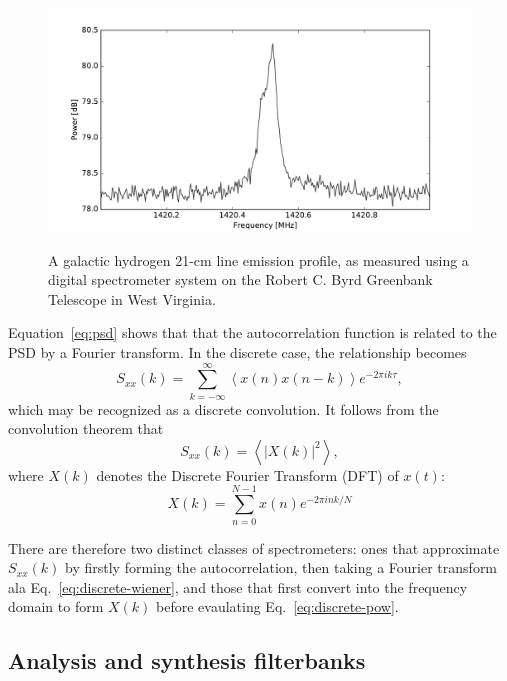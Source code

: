 \documentclass{ws-rv961x669}
\begin{document}
\begin{figure}
 \centering
 \includegraphics[width=\textwidth]{./figures/hydrogen.pdf}
 \label{fig:hydrogen}
 \caption{A galactic hydrogen 21-cm line emission profile, as measured using a digital spectrometer system on the Robert C. Byrd Greenbank Telescope in West Virginia.}
\end{figure}

Equation~\ref{eq:psd} shows that that the autocorrelation function is related to the PSD by a Fourier transform. In the discrete case, the relationship becomes
\begin{equation}
S_{xx}(k)=\sum_{k=-\infty}^{\infty}\left\langle x(n)x(n-k)\right\rangle e^{-2\pi ik\tau},\label{eq:discrete-wiener}
\end{equation}
which may be recognized as a discrete convolution. It follows from the convolution theorem that 
\begin{equation}
S_{xx}(k)=\left\langle \left|X(k)\right|^{2}\right\rangle ,\label{eq:discrete-pow}
\end{equation}
where $X(k)$ denotes the Discrete Fourier Transform (DFT) of $x(t)$:
\begin{equation}
X(k)=\sum_{n=0}^{N-1}x(n)e^{-2\pi ink/N}
\end{equation}

There are therefore two distinct classes of spectrometers: ones that approximate $S_{xx}(k)$ by firstly forming the autocorrelation, then taking a Fourier transform ala Eq.~\ref{eq:discrete-wiener}, and those that first convert into the frequency domain to form $X(k)$ before evaulating Eq.~\ref{eq:discrete-pow}.

\subsection{Analysis and synthesis filterbanks}
\end{document}
